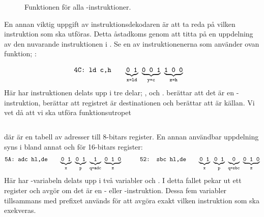 \documentclass[main.tex]{subfiles}
\begin{document}
\begin{figure}
    \inputminted{vhdl}{lst/vhdl_instr.vhd}
    \caption{Funktionen för alla -instruktioner.}
    \label{fig:ld}
\end{figure}

En annan viktig uppgift av instruktionsdekodaren är att ta reda på vilken
instruktion som ska utföras. Detta åstadkoms genom att titta på en uppdelning
av den nuvarande instruktionen i . Se en av instruktionenerna som
använder ovan funktion; :

\begin{align*}
    &\texttt{4C: ld c,h}& \quad &
    {\underbrace{\texttt{0 1}}_{\texttt{x=ld}}}\texttt{ }
    {\underbrace{\texttt{0 0 1}}_{\texttt{y=c}}}\texttt{ }
    {\underbrace{\texttt{1 0 0}}_{\texttt{z=h}}}
\end{align*}
Här har instruktionen delats upp i tre delar; ,  och .
 berättar att det är en -instruktion,  berättar
att registret  är destinationen och  berättar att  är
källan. Vi vet då att vi ska utföra funktionsutropet
\begin{center}
    \inputminted{vhdl}{lst/vhdl_ld.vhd}
\end{center}
där  är en tabell av adresser till 8-bitars register. En annan
användbar uppdelning syns i bland annat  och  för 16-bitars
register:
\begin{align*}
    &\texttt{5A: adc hl,de}& \quad &
    {\underbrace{\texttt{0 1}}_{\texttt{x}}}\texttt{ }
    {\underbrace{\texttt{0 1}}_{\texttt{p}}}\texttt{ }
    {\underbrace{\texttt{1}}_{\texttt{q=adc}}}\texttt{ }
    {\underbrace{\texttt{0 1 0}}_{\texttt{z}}}
    \qquad
    &\texttt{52: sbc hl,de}& \quad &
    {\underbrace{\texttt{0 1}}_{\texttt{x}}}\texttt{ }
    {\underbrace{\texttt{0 1}}_{\texttt{p}}}\texttt{ }
    {\underbrace{\texttt{0}}_{\texttt{q=sbc}}}\texttt{ }
    {\underbrace{\texttt{0 1 0}}_{\texttt{z}}}
\end{align*}
Här har -variabeln delats upp i två variabler  och .
I detta fallet pekar  ut ett register och  avgör om det är en
- eller -instruktion. Dessa fem variabler tillsammans med
prefixet används för att avgöra exakt vilken instruktion som ska exekveras.
\end{document}
